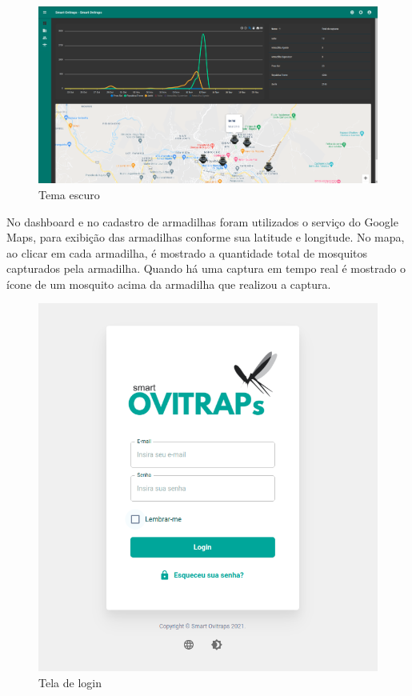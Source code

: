 \documentclass[
	12pt,				%
	openright,			%
	oneside,			%
	a4paper,			%
	chapter=TITLE,		%
	english,			%
	brazil				%
	]{abntex2}
\begin{document}
\begin{figure}[H]
    \centering
    \includegraphics[scale=0.20]{imagens/front_2.png}
    \caption{Tema escuro}
        \label{fig:dark}
    \end{figure}

No dashboard e no cadastro de armadilhas foram utilizados o serviço do Google Maps,
para exibição das armadilhas conforme sua latitude e longitude. No mapa, ao clicar em cada armadilha, é mostrado a 
quantidade total de mosquitos capturados pela armadilha.
Quando há uma captura em tempo real é mostrado o ícone de um mosquito acima da armadilha que realizou a captura.

\begin{figure}[H]
    \centering
    \includegraphics[scale=0.5]{imagens/front_5.png}
    \caption{Tela de login}
        \label{fig:login}
    \end{figure}
\end{document}
